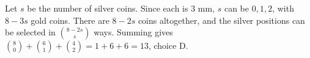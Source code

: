 Let $s$ be the number of silver coins. Since each is $3$ mm, $s$ can be $0,1,2$, with $8-3s$ gold coins. There are $8-2s$ coins altogether, and the silver positions can be selected in $\binom{8-2s}{s}$ ways. Summing gives $\binom 80+\binom 61+\binom 42=1+6+6=\boxed{13}$, choice D.
